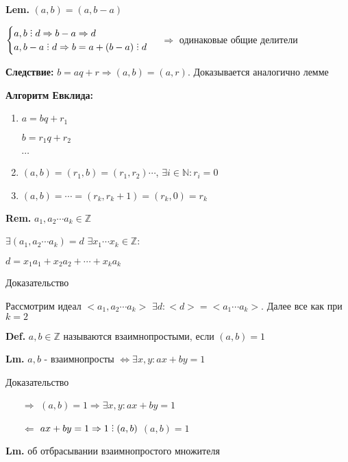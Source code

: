 \documentclass[14pt, letter paper]{article}
\DeclareRobustCommand{\divby}{%
  \mathrel{\text{\vbox{\baselineskip.65ex\lineskiplimit0pt\hbox{.}\hbox{.}\hbox{.}}}}%
}
\begin{document}
\textbf{Lem.} $(a, b) = (a, b - a)$

$\begin{cases}
    a, b \divby d \Rightarrow b - a \Rightarrow d \\
    a, b-a \divby d \Rightarrow b = a + (b - a) \divby d
\end{cases}$
$\Rightarrow$ одинаковые общие делители

\textbf{Следствие:} $b = aq + r \Rightarrow (a, b) = (a, r)$. Доказывается аналогично лемме

\textbf{Алгоритм Евклида:}
\begin{enumerate}
    \item $a = bq + r_1$ 
    
    $b = r_1 q + r_2$

    $\cdots$
    
    \item $(a, b) = (r_1, b) = (r_1, r_2) \cdots$, $\exists i \in \mathds{N}: r_i = 0$
    \item $(a, b) = \cdots = (r_k, r_k+1) = (r_k, 0) = r_k$
\end{enumerate}

\textbf{Rem.} $a_1, a_2 \cdots a_k \in \mathds{Z}$

$\exists (a_1, a_2 \cdots a_k) = d$ $\exists x_1 \cdots x_k \in \mathds{Z}:$

$d = x_1 a_1 + x_2 a_2 + \cdots + x_k a_k$

\begin{center}
    Доказательство
\end{center}

Рассмотрим идеал $<a_1, a_2 \cdots a_k>$ $\exists d: <d> = <a_1 \cdots a_k>$. Далее все как при $k = 2$

\textbf{Def.} $a, b \in \mathds{Z}$ называются взаимнопростыми, если $(a, b) = 1$

\textbf{Lm.} $a, b$ - взаимнопросты $\Leftrightarrow \exists x, y : ax + by = 1$

\begin{center}
    Доказательство
\end{center}

\begin{itemize}
    \item[$\Rightarrow$] $(a, b) = 1 \Rightarrow \exists x, y : ax + by = 1$
    \item[$\Leftarrow$] $ax + by = 1 \Rightarrow 1 \divby (a, b)$ $(a, b) = 1$
\end{itemize}

\textbf{Lm.} об отбрасывании взаимнопростого множителя
\end{document}
